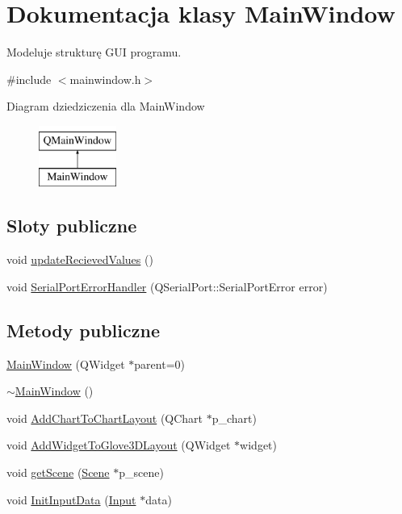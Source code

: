 \hypertarget{class_main_window}{}\section{Dokumentacja klasy Main\+Window}
\label{class_main_window}


Modeluje strukturę G\+UI programu.  




{\ttfamily \#include $<$mainwindow.\+h$>$}

Diagram dziedziczenia dla Main\+Window\begin{figure}[H]
\begin{center}
\leavevmode
\includegraphics[height=2.000000cm]{class_main_window}
\end{center}
\end{figure}
\subsection*{Sloty publiczne}
\begin{DoxyCompactItemize}
\item 
void \hyperlink{class_main_window_a5aac21b5760e96b276d89fa73d20c279}{update\+Recieved\+Values} ()
\item 
void \hyperlink{class_main_window_a282b4cae4900448d6ce21598c50c58a8}{Serial\+Port\+Error\+Handler} (Q\+Serial\+Port\+::\+Serial\+Port\+Error error)
\end{DoxyCompactItemize}
\subsection*{Metody publiczne}
\begin{DoxyCompactItemize}
\item 
\hyperlink{class_main_window_a8b244be8b7b7db1b08de2a2acb9409db}{Main\+Window} (Q\+Widget $\ast$parent=0)
\item 
\hyperlink{class_main_window_ae98d00a93bc118200eeef9f9bba1dba7}{$\sim$\+Main\+Window} ()
\item 
void \hyperlink{class_main_window_a28c931197fe41747312d4634b39ea786}{Add\+Chart\+To\+Chart\+Layout} (Q\+Chart $\ast$p\+\_\+chart)
\item 
void \hyperlink{class_main_window_ad1878f043e440b2917d12ed59caaca0c}{Add\+Widget\+To\+Glove3\+D\+Layout} (Q\+Widget $\ast$widget)
\item 
void \hyperlink{class_main_window_ab82b9864da7ab88d14388796c706b1d6}{get\+Scene} (\hyperlink{class_scene}{Scene} $\ast$p\+\_\+scene)
\item 
void \hyperlink{class_main_window_abd0772bfb398165834c0693627603b0f}{Init\+Input\+Data} (\hyperlink{class_input}{Input} $\ast$data)
\end{DoxyCompactItemize}
